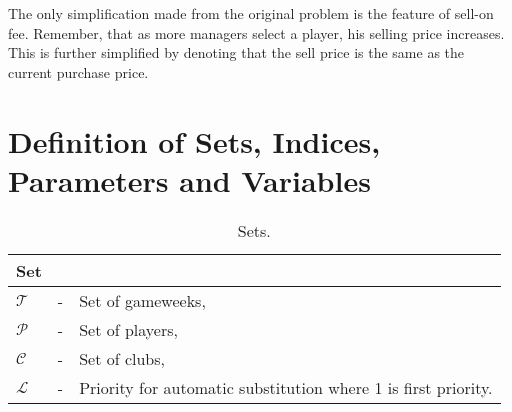 \newpar

The only simplification made from the original problem is the feature of sell-on fee. Remember, that as more managers select a player, his selling price increases. This is further simplified by denoting that the sell price is the same as the current purchase price. 


\begin{comment}

The only uncertainty in this problem is the number of points a player will get in each gameweek. Hence, the model is formulated accordingly. All the uncertainty lies in the objective function, and this is presented by $\rho_{pt}(\omega)$. This represents the number of points for a player $p$ in a gameweek $t$ dependent on a realization of a future event $\omega$. This event denotes all the factors deciding a player's point in a gameweek. For a goalkeeper, that includes factors such as the number of goals conceded, number of saves, penalty saved etc.

\newpar

Though the objective function is formulated in such way that it maximizes the number of expected points, once the model is solved  the objective value itself is not of interest. In the end it is the optimal team selection for a gameweek that is significant. In addition, the captain- and vice-captain choice, as well as the substitution priority are important outputs. This is reflected in the model by having small positive parameters in the objective function to ensure that these are picked accordingly. 

\end{comment}







\section{Definition of Sets, Indices, Parameters and Variables}\label{def_sets_ind_par_var}

\begin{table}[H]
\centering
\caption{Sets.}
\begin{tabular}{@{}lll@{}}
\toprule
Set           &   &                                                               \\ \midrule
$\mathcal{T}$ & - & Set of gameweeks,                                             \\
$\mathcal{P}$ & - & Set of players,                                               \\
$\mathcal{C}$ & - & Set of clubs,                                                 \\
$\mathcal{L}$ & - & Priority for automatic substitution where 1 is first priority. \\
\bottomrule
\end{tabular}
\end{table}

